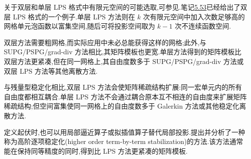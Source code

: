 \begin{note}\label{note:oseen-lps-two-vs-one-level}
关于双层和单层 LPS 格式中有限元空间的可能选取,可参见\textcite{MatthiesSkrzypaczTobiska2007}.笔记\hyperref[note:oseen-lps-infsup]{5.53}已经给出了双层 LPS 格式的一个例子.单层 LPS 方法则在 $k$ 次有限元空间中加入次数足够高的网格单元泡函数以富集空间,随后可将投影空间取为 $k-1$ 次不连续函数空间.

双层方法需要粗网格,而实际应用中未必总能获得这样的网格;此外,与 SUPG/PSPG/grad-div 方法相比,其矩阵模板也更宽.单层方法得到的矩阵模板比双层方法更紧凑,但在同一网格上,其自由度数多于 SUPG/PSPG/grad-div 方法或双层 LPS 方法等其他离散方法.
\end{note}

\begin{note}\label{note:oseen-lps-implementation}
与残量型稳定化相比,双层 LPS 方法会使矩阵稀疏结构扩展:同一宏单元内的所有自由度都相互耦合.单层 LPS 方法不会通过耦合原本互不相连的自由度来扩展矩阵稀疏结构;但空间富集使同一网格上的自由度数多于 Galerkin 方法或其他稳定化离散方法.
\end{note}

\begin{note}[起伏的另一种定义]\label{note:oseen-lps-fluctuation-variants}
定义起伏时,也可以用局部逼近算子或拟插值算子替代局部投影.\textcite{ChaconRebolloGomezGiraultSanchez2013}提出并分析了一种称为高阶逐项稳定化(higher order term-by-term stabilization)的方法.该方法通常能在保持同等精度的同时,得到比 LPS 方法更紧凑的矩阵模板.
\end{note}

